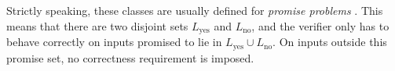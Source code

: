 
Strictly speaking, these classes are usually defined for \emph{promise problems} \cite{gharibianQuantumComplexityTheory}.
This means that there are two disjoint sets
\(
L_{\mathrm{yes}}
\)
and
\(
L_{\mathrm{no}}
\),
and the verifier only has to behave correctly on inputs promised to lie in
\(
L_{\mathrm{yes}}\cup L_{\mathrm{no}}
\).
On inputs outside this promise set, no correctness requirement is imposed.

